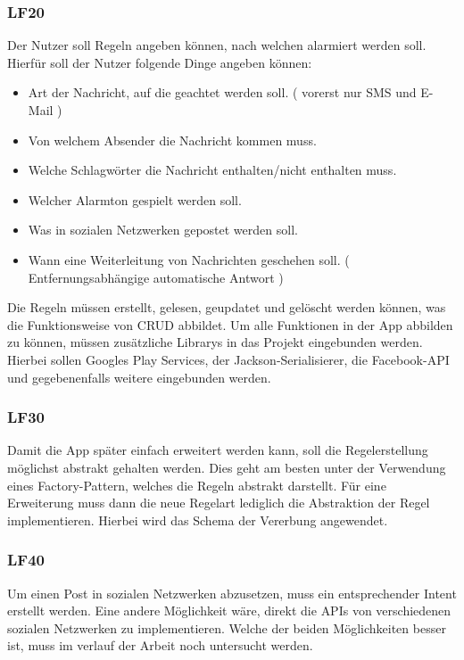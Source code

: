 \subsubsection{LF20}
Der Nutzer soll Regeln angeben k\"onnen, nach welchen alarmiert werden soll. Hierf\"ur soll der Nutzer folgende Dinge angeben k\"onnen:
\begin{itemize}
 \item Art der Nachricht, auf die geachtet werden soll. ( vorerst nur SMS und E-Mail )
 \item Von welchem Absender die Nachricht kommen muss.
 \item Welche Schlagw\"orter die Nachricht enthalten/nicht enthalten muss.
 \item Welcher Alarmton gespielt werden soll.
 \item Was in sozialen Netzwerken gepostet werden soll.
 \item Wann eine Weiterleitung von Nachrichten geschehen soll. ( Entfernungsabh\"angige automatische Antwort )
\end{itemize}

Die Regeln m\"ussen erstellt, gelesen, geupdatet und gel\"oscht werden k\"onnen, was die Funktionsweise von CRUD abbildet.
Um alle Funktionen in der App abbilden zu k\"onnen, m\"ussen zus\"atzliche Librarys in das Projekt eingebunden werden. Hierbei sollen Googles Play Services, der Jackson-Serialisierer, die Facebook-\ac{API} und gegebenenfalls weitere eingebunden werden.

\subsubsection{LF30}
Damit die App sp\"ater einfach erweitert werden kann, soll die Regelerstellung m\"oglichst abstrakt gehalten werden. Dies geht am besten unter der Verwendung eines Factory-Pattern, welches die Regeln abstrakt darstellt. F\"ur eine Erweiterung muss dann die neue Regelart lediglich die Abstraktion der Regel implementieren. Hierbei wird das Schema der Vererbung angewendet.

\subsubsection{LF40}
Um einen Post in sozialen Netzwerken abzusetzen, muss ein entsprechender Intent erstellt werden. Eine andere M\"oglichkeit w\"are, direkt die \ac{API}s von verschiedenen sozialen Netzwerken zu implementieren. Welche der beiden M\"oglichkeiten besser ist, muss im verlauf der Arbeit noch untersucht werden.

